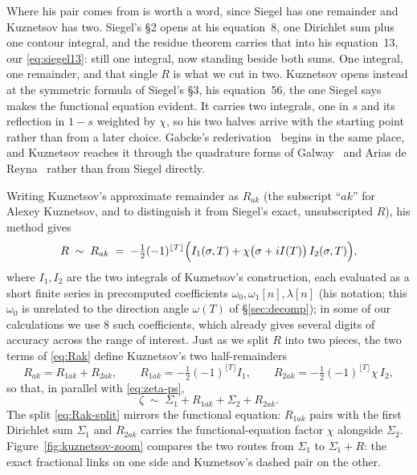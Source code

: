 \documentclass[11pt]{article}
\theoremstyle{definition}
\begin{document}
Where his pair comes from is worth a word, since Siegel has one remainder and
Kuznetsov has two. Siegel's \S2 opens at his equation~8, one Dirichlet sum plus
one contour integral, and the residue theorem carries that into his
equation~13, our \eqref{eq:siegel13}: still one integral, now standing beside
both sums. One integral, one remainder, and that single $R$ is what we cut in
two. Kuznetsov opens instead at the symmetric formula of Siegel's \S3, his
equation~56, the one Siegel says makes the functional equation evident. It
carries two integrals, one in $s$ and its reflection in $1-s$ weighted by
$\chi$, so his two halves arrive with the starting point rather than from a
later choice. Gabcke's rederivation~\cite{Gabcke1979} begins in the same place,
and Kuznetsov reaches it through the quadrature forms of
Galway~\cite{Galway2001} and Arias de Reyna~\cite{AriasDeReyna2011} rather than
from Siegel directly.

Writing Kuznetsov's approximate remainder as $R_{ak}$ (the subscript ``$ak$''
for Alexey Kuznetsov, and to distinguish it from Siegel's exact, unsubscripted
$R$), his method gives
\begin{equation}\label{eq:Rak}
R \;\sim\; R_{ak}
\;=\; -\tfrac12(-1)^{\lfloor T\rfloor}
\Bigl(I_{1}(\sigma,T) + \chi\bigl(\sigma+iI(T)\bigr)\,I_{2}(\sigma,T)\Bigr),
\end{equation}
where $I_1,I_2$ are the two integrals of Kuznetsov's construction, each
evaluated as a short finite series in precomputed coefficients
$\omega_0,\omega_1[n],\lambda[n]$ (his notation; this $\omega_0$ is
unrelated to the direction angle $\omega(T)$ of \S\ref{sec:decomp}); in
some of our calculations we use $8$ such
coefficients, which already gives several digits of accuracy across the range of
interest. Just as we split $R$ into two pieces, the two terms of \eqref{eq:Rak}
define Kuznetsov's two half-remainders
\begin{equation}\label{eq:Rak-split}
R_{ak}=R_{1ak}+R_{2ak},\qquad
R_{1ak}=-\tfrac12(-1)^{\lfloor T\rfloor}I_{1},\qquad
R_{2ak}=-\tfrac12(-1)^{\lfloor T\rfloor}\chi\,I_{2},
\end{equation}
so that, in parallel with \eqref{eq:zeta-ps},
\[
\zeta \;\sim\; \Sigma_1 + R_{1ak} + \Sigma_2 + R_{2ak}.
\]
The split \eqref{eq:Rak-split} mirrors the functional equation: $R_{1ak}$ pairs
with the first Dirichlet sum $\Sigma_1$ and $R_{2ak}$ carries the
functional-equation factor $\chi$ alongside $\Sigma_2$.
Figure~\ref{fig:kuznetsov-zoom} compares the two routes from $\Sigma_1$ to
$\Sigma_1+R$: the exact fractional links on one side and Kuznetsov's dashed
pair on the other.
\end{document}
